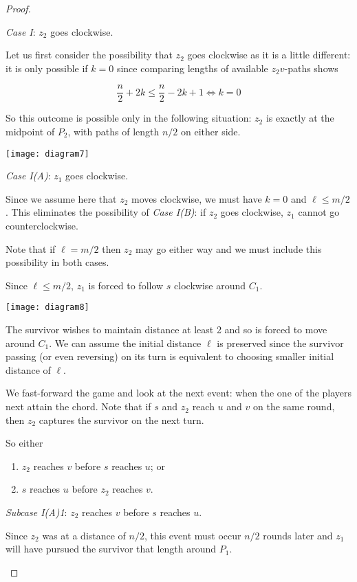 \documentclass[letterpaper, 10pt]{article}
\begin{document}
\begin{proof}
\begin{proofpart}
\emph{Case I}: $z_2$ goes clockwise.

Let us first consider the possibility that
$z_2$ goes clockwise as it is a little different: it is only possible if $k=0$ since
comparing lengths of available $z_2v$-paths shows

\[\frac{n}{2} +2k \leq \frac{n}{2} -2k + 1\iff k=0 \]

So this outcome is possible only in the following situation: $z_2$ is exactly at the midpoint of $P_2$,
with paths of length $n/2$ on either side.

\begin{center}
\texttt{[image: diagram7]}
\end{center}

\emph{Case I(A)}: $z_1$ goes clockwise.

Since we assume here that $z_2$ moves clockwise, we must have $k=0$ and $\ell \leq m/2$.
This eliminates the possibility of \emph{Case I(B)}: if $z_2$ goes clockwise,
$z_1$ cannot go counterclockwise.

Note that if $\ell = m/2$ then $z_2$ may go either way and we must include this
possibility in both cases.

Since $\ell \leq m/2$, $z_1$ is forced to follow $s$ clockwise around $C_1$.

\begin{center}
\texttt{[image: diagram8]}
\end{center}

The survivor wishes to maintain distance at least 2 and so is forced to move around $C_1$. We can assume
the initial distance $\ell$ is preserved since the survivor passing (or even reversing) on its turn
is equivalent to choosing smaller initial distance of $\ell$.

We fast-forward the game and look at the next event: when the one of the players next attain the chord.
Note that if $s$ and $z_2$ reach $u$ and $v$ on the same round, then $z_2$ captures
the survivor on the next turn.

So either
\begin{enumerate}
\item $z_2$ reaches $v$ before $s$ reaches $u$; or
\item $s$ reaches $u$ before $z_2$ reaches $v$.
\end{enumerate}

\emph{Subcase I(A)1}: $z_2$ reaches $v$ before $s$ reaches $u$.

Since $z_2$ was at a distance of $n/2$, this event must occur $n/2$ rounds later and $z_1$ will
have pursued the survivor that length around $P_1$.


\end{proofpart}
\end{proof}
\end{document}
